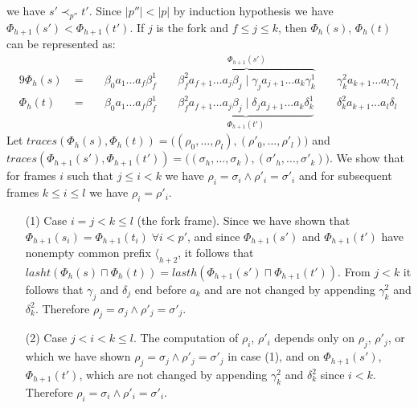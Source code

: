 \documentclass[AMA,STIX1COL]{WileyNJD-v2}
\newcommand{\Xl}{\langle}
\begin{document}
\begin{proofEnd}
    we have $s' \prec_{p''} t'$.
    Since $|p''| < |p|$ by induction hypothesis we have $\Phi_{h+1}(s') < \Phi_{h+1}(t')$.
    If $j$ is the fork and $f \leq j \leq k$, then
    $\Phi_{h}(s)$, $\Phi_{h}(t)$ can be represented as:
    \begin{alignat*}{9}
        \Phi_{h}(s)
            \;&=
                \;&& \beta_0 a_1 \dots a_f \beta_f^1
                \;&& \overbrace {\beta_f^2  a_{f+1} \dots a_j \beta_j \;\big|\; \gamma_j a_{j+1} \dots a_k \gamma_k^1}^{\Phi_{h+1}(s')}
                \;&& \gamma_k^2 a_{k+1} \dots a_l \gamma_l
                \\[-0.5em]
        \Phi_{h}(t)
            \;&=
                \;&& \beta_0 a_1 \dots a_f \beta_f^1
                \;&& \underbrace {\beta_f^2  a_{f+1} \dots a_j \beta_j \;\big|\; \delta_j a_{j+1} \dots a_k \delta_k^1}_{\Phi_{h+1}(t')}
                \;&& \delta_k^2 a_{k+1} \dots a_l \delta_l
    \end{alignat*}
    Let $traces (\Phi_{h}(s), \Phi_{h}(t)) = \big( (\rho_0, \dots, \rho_l), (\rho'_0, \dots, \rho'_l) \big)$
    and $traces (\Phi_{h+1}(s'), \Phi_{h+1}(t')) = \big( (\sigma_h, \dots, \sigma_k), (\sigma'_h, \dots, \sigma'_k) \big)$.
    We show that for frames $i$ such that $j \leq i < k$ we have
    $\rho_i = \sigma_i \wedge \rho'_i = \sigma'_i$
    and for subsequent frames $k \leq i \leq l$ we have $\rho_i = \rho'_i$.
    \begin{itemize}[itemsep=0.5em, topsep=0.5em]
    \item[(1)]
        Case $i = j < k \leq l$ (the fork frame).
        Since we have shown that $\Phi_{h+1}(s_i) = \Phi_{h+1}(t_i) \;\forall i < p'$,
        and since $\Phi_{h+1}(s')$ and $\Phi_{h+1}(t')$ have nonempty common prefix $\Xl_{h+2}$,
        it follows that $lasht (\Phi_{h}(s) \sqcap \Phi_{h}(t)) = lasth (\Phi_{h+1}(s') \sqcap \Phi_{h+1}(t'))$.
        From $j < k$ it follows that $\gamma_j$ and $\delta_j$ end before $a_k$
        and are not changed by appending $\gamma^2_k$ and $\delta^2_k$.
        Therefore $\rho_j = \sigma_j \wedge \rho'_j = \sigma'_j$.

    \item[(2)]
        Case $j < i < k \leq l$.
        The computation of $\rho_i$, $\rho'_i$ depends only on
        $\rho_j$, $\rho'_j$,
        or which we have shown $\rho_j = \sigma_j \wedge \rho'_j = \sigma'_j$ in case (1),
        and on $\Phi_{h+1}(s')$, $\Phi_{h+1}(t')$,
        which are not changed by appending $\gamma^2_k$ and $\delta^2_k$ since $i < k$.
        Therefore $\rho_i = \sigma_i \wedge \rho'_i = \sigma'_i$.


\end{itemize}
\end{proofEnd}
\end{document}
